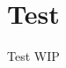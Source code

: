 \documentclass[../../UsabilityReport.tex]{subfiles}
\begin{document}
\section{Test}
	Test WIP
\end{document}
